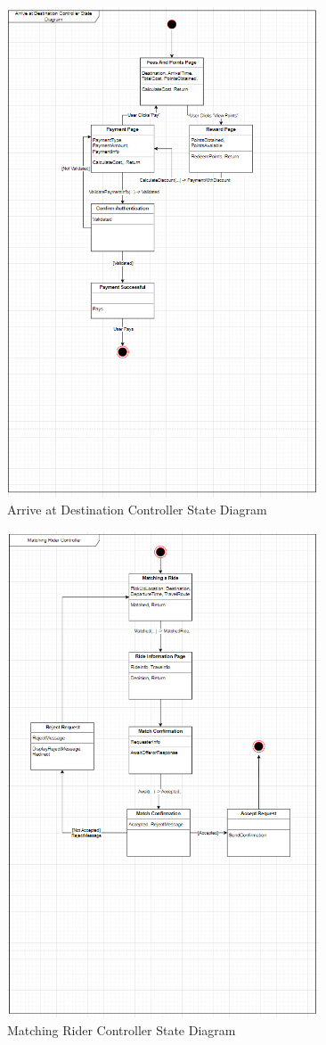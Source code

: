 \documentclass[]{article}
\begin{document}
\begin{figure}[h]
	\centering
	\includegraphics[width=25em]{assets/D3_9.PNG}
	\caption{Arrive at Destination Controller State Diagram}
	\label{fig:acd}
\end{figure}
\pagebreak

\begin{figure}[h]
	\centering
	\includegraphics[width=25em]{assets/D3_10.PNG}
	\caption{Matching Rider Controller State Diagram}
	\label{fig:acd}
\end{figure}
\pagebreak
\end{document}
